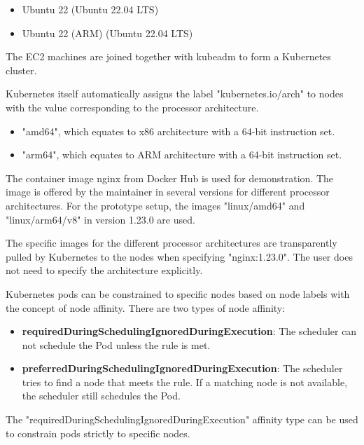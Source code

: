 \begin{itemize}
    \item Ubuntu 22 (Ubuntu 22.04 LTS) 
    \cite{ubuntu22amd64MarketplaceAmazonAwsWebsite}
    \item Ubuntu 22 (ARM) (Ubuntu 22.04 LTS) 
    \cite{ubuntu22arm64MarketplaceAmazonAwsWebsite}
\end{itemize}

The EC2 machines are joined together with kubeadm 
\cite{kubeadmKubernetes} 
to form a Kubernetes cluster.

Kubernetes itself automatically assigns the label "kubernetes.io/arch" to nodes 
with the value corresponding to the processor architecture.

\begin{itemize}
    \item "amd64", which equates to x86 architecture with a 64-bit instruction set.
    \item "arm64", which equates to ARM architecture with a 64-bit instruction set.
\end{itemize}

The container image nginx 
\cite{nginxDockerHub} 
from Docker Hub is used for demonstration. 
The image is offered by the maintainer in several versions for different processor architectures.
For the prototype setup, the images 
"linux/amd64" \cite{amd64ImageNginxDockerHub}
and
"linux/arm64/v8" \cite{arm64v8ImageNginxDockerHub}
in version 1.23.0
are used.

The specific images for the different processor architectures
are transparently pulled by Kubernetes to the nodes
when specifying "nginx:1.23.0".
The user does not need to specify the architecture explicitly.

Kubernetes pods can be constrained to specific nodes
based on node labels
with the concept of node affinity.
There are two types of node affinity:

\begin{itemize}
    \item \textbf{requiredDuringSchedulingIgnoredDuringExecution}: The scheduler can not schedule the Pod unless the rule is met.
    \item \textbf{preferredDuringSchedulingIgnoredDuringExecution}: The scheduler tries to find a node that meets the rule. If a matching node is not available, the scheduler still schedules the Pod.
\end{itemize}

The "requiredDuringSchedulingIgnoredDuringExecution"
affinity type can be used to constrain pods
strictly to specific nodes.

